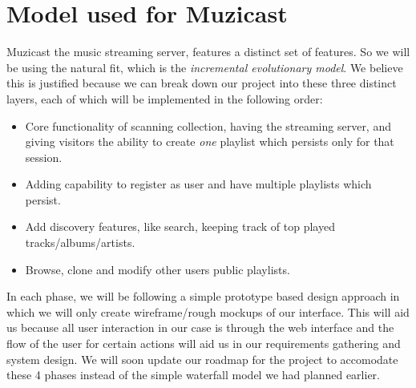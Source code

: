 \documentclass{article}
\begin{document}
\newpage{}
\section{Model used for Muzicast}

Muzicast the music streaming server, features a distinct set of features. So we will be using the natural fit, which is the \emph{incremental evolutionary model}. We believe this is justified because we can break down our project into these three distinct layers, each
of which will be implemented in the following order:

\begin{itemize}
\item Core functionality of scanning collection, having the streaming server, and giving visitors the ability to create \emph{one} playlist which persists only for that session.
\item Adding capability to register as user and have multiple playlists which persist.
\item Add discovery features, like search, keeping track of top played\\ tracks/albums/artists.
\item Browse, clone and modify other users public playlists.
\end{itemize}

In each phase, we will be following a simple prototype based design approach in which we will only create wireframe/rough mockups of our interface. This will aid us because all user interaction in our case is through the web interface and the flow of the user for certain actions will aid us in our requirements gathering and system design. We will soon update our roadmap for the project to accomodate these 4 phases instead of the simple waterfall model we had planned earlier.
\end{document}
